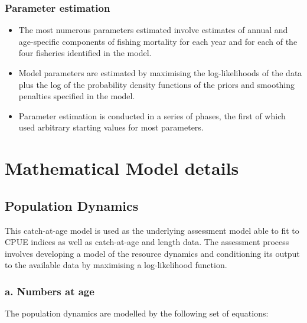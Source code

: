\documentclass{article}
\begin{document}

\subsubsection{Parameter estimation}

\begin{itemize}

\item The most numerous parameters estimated involve estimates of annual and age-specific components of fishing mortality for each year and for each of the four fisheries identified in the model.

\item Model parameters are estimated by maximising the log-likelihoods of the data plus the log of the probability density functions of the priors and smoothing penalties specified in the model.

\item Parameter estimation is conducted in a series of phases, the first of which used arbitrary starting values for most parameters.

\end{itemize}


\section{Mathematical Model details}
\subsection{Population Dynamics}
This catch-at-age model is used as the underlying assessment model able to fit to CPUE indices as well as catch-at-age and length data. The assessment process involves developing a model of the resource dynamics and conditioning its output to the available data by maximising a log-likelihood function.


\subsubsection{a. Numbers at age}

The population dynamics are modelled by the following set of equations:
\end{document}
